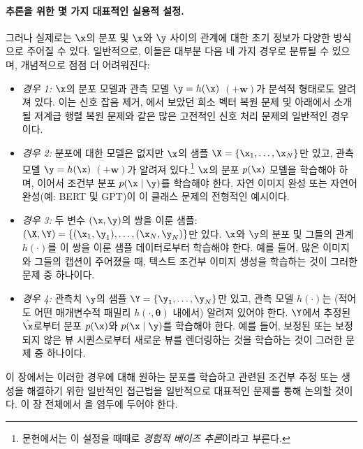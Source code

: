 \documentclass[../../book-main_ko.tex]{subfiles}
\begin{document}
\paragraph{추론을 위한 몇 가지 대표적인 실용적 설정.}
그러나 실제로는 $\x$의 분포 및 $\x$와 $\y$ 사이의 관계에 대한 초기 정보가 다양한 방식으로 주어질 수 있다. 일반적으로, 이들은 대부분 다음 네 가지 경우로 분류될 수 있으며, 개념적으로 점점 더 어려워진다:
\begin{itemize}
\item {\em 경우 1:} $\x$의 분포 모델과 관측 모델 $\y = h(\x)$ $(+ \boldsymbol{w})$가 분석적 형태로도 알려져 있다. 이는 신호 잡음 제거, 에서 보았던 희소 벡터 복원 문제 및 아래에서 소개될 저계급 행렬 복원 문제와 같은 많은 고전적인 신호 처리 문제의 일반적인 경우이다.
\item {\em 경우 2:} 분포에 대한 모델은 없지만 $\x$의 샘플 $\X = \{\x_1, \ldots, \x_N\}$만 있고, 관측 모델 $\y = h(\x)$ $(+ \boldsymbol{w})$가 알려져 있다.\footnote{문헌에서는 이 설정을 때때로 {\em 경험적 베이즈 추론}이라고 부른다.} $\x$의 분포 $p(\x)$ 모델을 학습해야 하며, 이어서 조건부 분포 $p(\x\mid \y)$를 학습해야 한다. 자연 이미지 완성 또는 자연어 완성(예: BERT 및 GPT)이 이 클래스 문제의 전형적인 예시이다.
\item {\em 경우 3:} 두 변수 $(\x, \y)$의 쌍을 이룬 샘플: $(\X, \Y) = \{ (\x_1, \y_1), \ldots, (\x_N, \y_N) \}$만 있다. $\x$와 $\y$의 분포 및 그들의 관계 $h(\cdot)$를 이 쌍을 이룬 샘플 데이터로부터 학습해야 한다. 예를 들어, 많은 이미지와 그들의 캡션이 주어졌을 때, 텍스트 조건부 이미지 생성을 학습하는 것이 그러한 문제 중 하나이다.
\item {\em 경우 4:} 관측치 $\y$의 샘플 $\Y = \{\y_1, \ldots, \y_N\}$만 있고, 관측 모델 $h(\cdot)$는 (적어도 어떤 매개변수적 패밀리 $h(\cdot, \boldsymbol{\theta})$ 내에서) 알려져 있어야 한다. $\Y$에서 추정된 $\hat{\x}$로부터 분포 $p(\x)$와 $p(\x \mid \y)$를 학습해야 한다. 예를 들어, 보정된 또는 보정되지 않은 뷰 시퀀스로부터 새로운 뷰를 렌더링하는 것을 학습하는 것이 그러한 문제 중 하나이다.
\end{itemize}
이 장에서는 이러한 경우에 대해 원하는 분포를 학습하고 관련된 조건부 추정 또는 생성을 해결하기 위한 일반적인 접근법을 일반적으로 대표적인 문제를 통해 논의할 것이다. 이 장 전체에서 을 염두에 두어야 한다.
\end{document}

